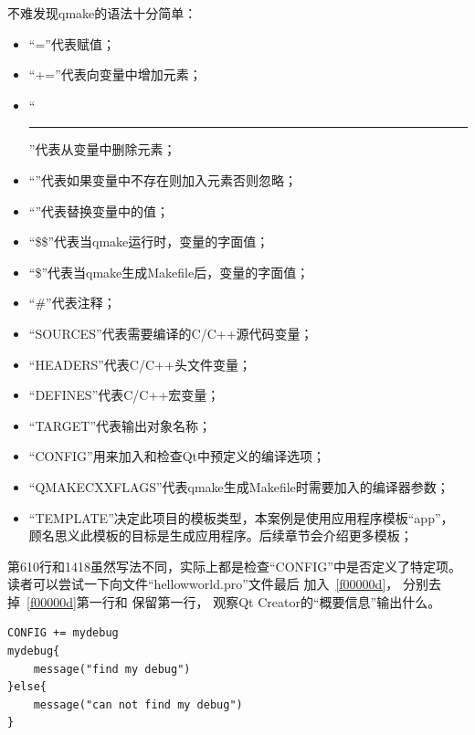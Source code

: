 不难发现qmake的语法十分简单：
\begin{itemize}
\item “{\sourcefonttwo{}=}”代表赋值；
\item “{\sourcefonttwo{}+}{\sourcefonttwo{}=}”代表向变量中增加元素；
\item “\hspace{0.05em}\rule[0.7ex]{0.4em}{0.65pt}\hspace{0.05em}{\sourcefonttwo{}=}”代表从变量中删除元素；
\item “\raisebox{-0.35ex}{\sourcefonttwo{}*}{\sourcefonttwo{}=}”代表如果变量中不存在则加入元素否则忽略；
\item “\raisebox{0.16ex}{\sourcefonttwo\~{}}{\sourcefonttwo{}=}”代表替换变量中的值；
\item “{\sourcefonttwo\$}{\sourcefonttwo\$}”代表当qmake运行时，变量的字面值；
\item “{\sourcefonttwo\$}”代表当qmake生成Makefile后，变量的字面值；
\item “{\sourcefonttwo\#}”代表注释；
\item “SOURCES”代表需要编译的C/C{\sourcefonttwo{}+}{\sourcefonttwo{}+}源代码变量；
\item “HEADERS”代表C/C{\sourcefonttwo{}+}{\sourcefonttwo{}+}头文件变量；
\item “DEFINES”代表C/C{\sourcefonttwo{}+}{\sourcefonttwo{}+}宏变量；
\item “TARGET”代表输出对象名称；
\item “CONFIG”用来加入和检查Qt中预定义的编译选项；
\item “QMAKE\underline{\hspace{0.5em}}CXXFLAGS”代表qmake生成Makefile时需要加入的编译器参数；
\item “TEMPLATE”决定此项目的模板类型，本案例是使用应用程序模板“app”，
顾名思义此模板的目标是生成应用程序。后续章节会介绍更多模板；
\end{itemize}

第6\raisebox{0.16ex}{\sourcefonttwo\~{}}10行和14\raisebox{0.16ex}{\sourcefonttwo\~{}}18虽然写法不同，实际上都是检查“CONFIG”中是否定义了特定项。
读者可以尝试一下向文件“hellow\underline{\hspace{0.5em}}world.pro”文件最后
加入\lstlistingname\ \ref{f00000d}，
分别去掉\lstlistingname\ \ref{f00000d}第一行和
保留第一行，
观察Qt Creator的“概要信息”输出什么。
\FloatBarrier
\begin{lstlisting}[label=f00000d,
caption=GoodLuck,
title=\lstlistingname\ \thelstlisting
]
CONFIG += mydebug
mydebug{
    message("find my debug")
}else{
    message("can not find my debug")
}
\end{lstlisting}          %





